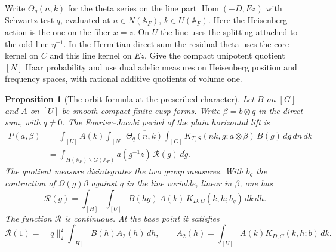 \documentclass[a4paper,11pt]{article}
\newtheorem{proposition}{Proposition}[section]
\theoremstyle{definition}
\theoremstyle{remark}
\numberwithin{equation}{section}
\begin{document}
Write \(\Theta_q(n,k)\) for the theta series on the line part
\(\operatorname{Hom}(-D,Ez)\) with Schwartz test \(q\), evaluated
at \(n\in N(\mathbb A_F)\), \(k\in U(\mathbb A_F)\). Here the
Heisenberg action is the one on the fiber \(x=z\). On \(U\)
the line uses the splitting attached to the odd line
\(\eta^{-1}\). In the Hermitian direct sum the residual theta
uses the core kernel on \(C\) and this line kernel on \(Ez\).
Give the compact unipotent quotient \([N]\) Haar probability
and use dual adelic measures on Heisenberg position and frequency
spaces, with rational additive quotients of volume one.

\begin{proposition}[The orbit formula at the prescribed character]\leavevmode
\label{prop:unfold263}
Let \(B\) on \([G]\) and \(A\) on \([U]\) be smooth compact-finite
cusp forms. Write \(\beta=b\otimes q\) in the direct sum, with
\(q\ne0\). The Fourier--Jacobi period of the plain horizontal
lift is
\[
 \begin{split}
 P(a,\beta)&=\int_{[U]} A(k)\int_{[N]}
       \overline{\Theta_q(n,k)}
       \int_{[G]} K_{T,S}(nk,g;a\otimes\beta)\,B(g)\,dg\,dn\,dk\\
 &=\int_{H(\mathbb A_F)\backslash G(\mathbb A_F)}
              a(g^{-1}z)\,\mathcal R(g)\,d\dot g .
 \end{split}
\]
The quotient measure disintegrates the two group measures.
With \(b_g\) the contraction of \(\Omega(g)\beta\) against
\(q\) in the line variable, linear in \(\beta\), one has
\[
 \mathcal R(g)=\int_{[H]}\int_{[U]} B(hg)\,A(k)\,
                       K_{D,C}(k,h;b_g)\,dk\,dh .
\]
The function \(\mathcal R\) is continuous. At the base point
it satisfies
\[
 \mathcal R(1)=\|q\|_2^2\int_{[H]} B(h)A_2(h)\,dh,\qquad
 A_2(h)=\int_{[U]}A(k)K_{D,C}(k,h;b)\,dk .
\]
\end{proposition}
\end{document}
